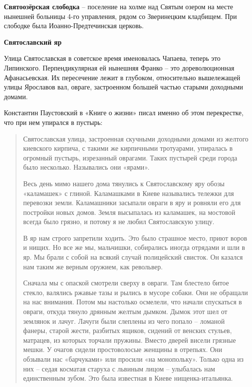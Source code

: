 \medskip

\textbf{Святоозёрская слободка} – поселение на холме над Святым озером на месте нынешней больницы 4-го управления, рядом со Зверинецким кладбищем. При слободке была Иоанно-Пред\-течинская церковь.\\

\medskip

\textbf{Святославский яр}

Улица Святославская в советское время именовалась Чапаева, теперь это Липинского. Перпендикулярная ей нынешняя Франко – это дореволюционная Афанасьевская. Их пересечение лежит в глубоком, относительно вышележащей улицы Ярославов вал, овраге, застроенном большей частью старыми доходными домами.

Константин Паустовский в «Книге о жизни» писал именно об этом перекрестке, что при нем упирался в пустырь:

\begin{quotation}
Святославская улица, застроенная скучными доходными домами из желтого киевского кирпича, с такими же кирпичными тротуарами, упиралась в огромный пустырь, изрезанный оврагами. Таких пустырей среди города было несколько. Назывались они «ярами».

Весь день мимо нашего дома тянулись к Святославскому яру обозы «каламашек» с глиной. Каламашками в Киеве назывались тележки для перевозки земли. Каламашники засыпали овраги в яру и ровняли его для постройки новых домов. Земля высыпалась из каламашек, на мостовой всегда было грязно, и потому я не любил Святославскую улицу.

В яр нам строго запретили ходить. Это было страшное место, приют воров и нищих. Но все же мы, мальчишки, собирались иногда отрядами и шли в яр. Мы брали с собой на всякий случай полицейский свисток. Он казался нам таким же верным оружием, как револьвер.

Сначала мы с опаской смотрели сверху в овраги. Там блестело битое стекло, валялись ржавые тазы и рылись в мусоре собаки. Они не обращали на нас внимания. Потом мы настолько осмелели, что начали спускаться в овраги, откуда тянуло дрянным желтым дымком. Дымок этот шел от землянок и лачуг. Лачуги были слеплены из чего попало – ломаной фанеры, старой жести, разбитых ящиков, сидений от венских стульев, матрацев, из которых торчали пружины. Вместо дверей висели грязные мешки. У очагов сидели простоволосые женщины в отрепьях. Они обзывали нас «барчуками» или просили «на монопольку». Только одна из них – седая косматая старуха с львиным лицом – улыбалась нам единственным зубом. Это была известная в Киеве нищенка-итальянка.
\end{quotation}

